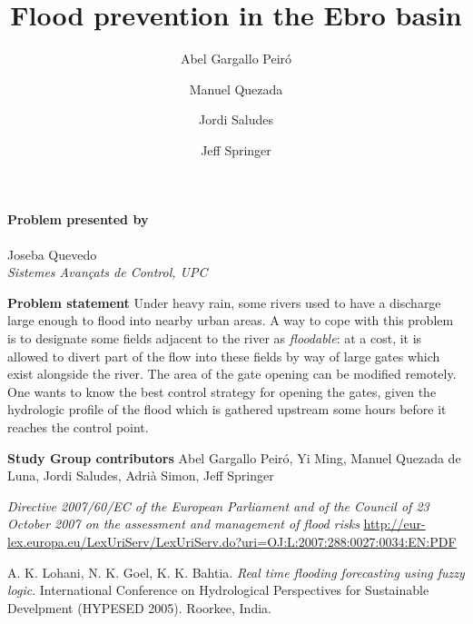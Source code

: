 \documentclass[a4paper,12pt,english]{article}
\title{Flood prevention in the Ebro basin}
\author{Abel Gargallo Peir\'o\and
Manuel Quezada\and
Jordi Saludes\and
Jeff Springer}
\begin{document}
\maketitle

\begin{center}
\textbf{Problem presented by} \\ \ \\ \large Joseba Quevedo \\ \normalsize \textit{Sistemes Avan{\c c}ats de Control, UPC}
\end{center}

\begin{center}
\textbf{Problem statement}
Under heavy rain, some rivers used to have a discharge large enough to flood into
nearby urban areas.
A way to cope with this problem is to designate some fields adjacent to the river as \emph{floodable}:
at a cost, it is allowed to divert part of the flow into these fields by way of large gates
which exist alongside the river. The area of the gate opening can be modified remotely.
One wants to know the best control strategy for opening the gates, given the hydrologic profile
of the flood which is gathered upstream some hours before it reaches the control point.
\end{center}



\begin{center}
\textbf{Study Group contributors}
Abel Gargallo Peir\'o,
Yi Ming,
Manuel Quezada de Luna,
Jordi Saludes,
Adri\`a Simon,
Jeff Springer
\end{center}

\newpage


\begin{thebibliography}{99}
\emph{Directive 2007/60/EC of the European Parliament and of the Council of 23 October 2007 on the assessment and management of flood risks}
\url{http://eur-lex.europa.eu/LexUriServ/LexUriServ.do?uri=OJ:L:2007:288:0027:0034:EN:PDF}

A. K. Lohani, N. K. Goel, K. K. Bahtia. \emph{Real time flooding forecasting using fuzzy logic}. International Conference on Hydrological Perspectives for
Sustainable Develpment (HYPESED 2005). Roorkee, India.
\end{thebibliography}
\end{document}
